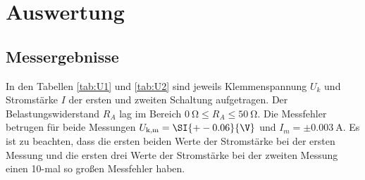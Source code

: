 

  \section{Auswertung}
  \subsection{Messergebnisse}

  In den Tabellen \ref{tab:U1} und \ref{tab:U2} sind jeweils
  Klemmenspannung $U_k$ und Stromstärke $I$
  der ersten und zweiten Schaltung aufgetragen. Der Belastungswiderstand $R_A$
  lag im Bereich $ \SI{0}{\ohm} \leq R_A \leq \SI{50}{\ohm} $.
  Die Messfehler betrugen für beide Messungen $U_\text{k,m} = \SI{+-0.06}{\V}$
  und $I_m = \pm \SI{0.003}{\A}$.
  Es ist zu beachten, dass die ersten beiden Werte der Stromstärke bei
  der ersten Messung und die ersten drei Werte der Stromstärke bei der zweiten
  Messung einen 10-mal so großen Messfehler haben.

